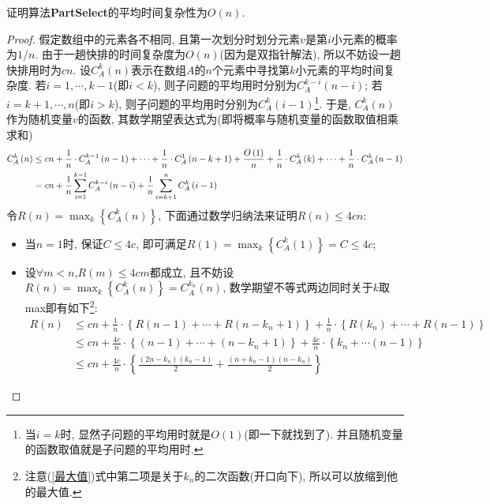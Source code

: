 \documentclass{article}
\begin{document}
\begin{homeworkProblem}
	证明算法\textbf{PartSelect}的平均时间复杂性为$O(n)$.
	\begin{proof}
		假定数组中的元素各不相同, 且第一次划分时划分元素$v$是第$i$小元素的概率为$1/n$. 由于一趟快排的时间复杂度为$O(n)$(因为是双指针解法), 所以不妨设一趟快排用时为$cn$. 设$C_{A}^{k}(n)$表示在数组$A$的$n$个元素中寻找第$k$小元素的平均时间复杂度. 若$i=1,\cdots,k-1$(即$i<k$), 则子问题的平均用时分别为$C_{A}^{k-i}(n-i)$; 若$i=k+1,\cdots,n$(即$i>k$), 则子问题的平均用时分别为$C_{A}^{k}(i-1)$\footnote{当$i=k$时, 显然子问题的平均用时就是$O(1)$(即一下就找到了). 并且随机变量的函数取值就是子问题的平均用时.}. 于是, $C_{A}^{k}(n)$作为随机变量$v$的函数, 其数学期望表达式为(即将概率与随机变量的函数取值相乘求和)
		\begin{align}
			C_{A}^{k}\left( n \right) &\leq cn + \frac{1}{n}\cdot C_{A}^{k-1}\left( n-1 \right) +\cdots +\frac{1}{n}\cdot C_{A}^{1}\left( n-k+1 \right) +\frac{O\left( 1 \right)}{n} +\frac{1}{n}\cdot C_{A}^{k}\left( k \right) +\cdots +\frac{1}{n}\cdot C_{A}^{k}\left( n-1 \right)  \notag
			\\
			&=cn+\frac{1}{n}\sum_{i=1}^{k-1}{C_{A}^{k-i}\left( n-i \right)}+\frac{1}{n}\sum_{i=k+1}^n{C_{A}^{k}\left( i-1 \right)} \notag
		\end{align}
		令$\displaystyle R\left( n \right) =\max_k \left\{ C_{A}^{k}\left( n \right) \right\}$, 下面通过数学归纳法来证明$R(n)\leq 4cn$:
		\begin{itemize}
			\item 当$n=1$时, 保证$C\leq 4c$, 即可满足$\displaystyle R\left( 1 \right) =\max_k \left\{ C_{A}^{k}\left( 1 \right) \right\} =C\le 4c$;
			\newpage
			\item 设$\forall m<n$,$R(m)\leq 4cm$都成立, 且不妨设$\displaystyle R\left( n \right) =\max_k \left\{ C_{A}^{k}\left( n \right) \right\} =C_{A}^{k_n}\left( n \right)$, 数学期望不等式两边同时关于$k$取max即有如下\footnote{注意(\ref{最大值})式中第二项是关于$k_n$的二次函数(开口向下), 所以可以放缩到他的最大值.}:
			\begin{align}
				R\left( n \right) &\le cn+\frac{1}{n}\cdot \left\{ R\left( n-1 \right) +\cdots +R\left( n-k_n+1 \right) \right\} +\frac{1}{n}\cdot \left\{ R\left( k_n \right) +\cdots +R\left( n-1 \right) \right\} 
				\\
				&\le cn+\frac{4c}{n}\cdot \left\{ \left( n-1 \right) +\cdots +\left( n-k_n+1 \right) \right\} +\frac{4c}{n}\cdot \left\{ k_n+\cdots \left( n-1 \right) \right\} 
				\\
				&\le cn+\frac{4c}{n}\cdot \left\{ \frac{\left( 2n-k_n \right) \left( k_n-1 \right)}{2}+\frac{\left( n+k_n-1 \right) \left( n-k_n \right)}{2} \right\} 

\end{align}
\end{itemize}
\end{proof}
\end{homeworkProblem}
\end{document}
